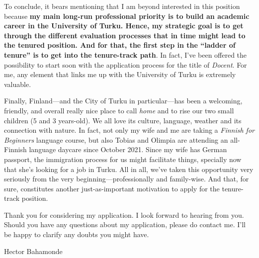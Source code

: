 \documentclass[10pt,stdletter,dateno,sigleft]{newlfm} %
\begin{document}
\begin{newlfm}
To conclude, it bears mentioning that I am beyond interested in this position because {\bf my main long-run professional priority is to build an academic career in the University of Turku.  Hence, my strategic goal is to get through the different evaluation processes that in time might lead to the tenured position. And for that, the first step in the ``ladder of tenure'' is to get into the tenure-track path}. In fact, I've been offered the possibility to start soon with the application process for the title of \emph{Docent}. For me, any element that links me up with the University of Turku is extremely valuable. 

Finally, Finland---and the City of Turku in particular---has been a welcoming, friendly, and overall really nice place to call \emph{home} and to rise our two small children (5 and 3 years-old). We all love its culture, language, weather and its connection with nature. In fact, not only my wife and me are taking a \emph{Finnish for Beginners} language course, but also Tobias and Olimpia are attending an all-Finnish language daycare since October 2021. Since my wife has German passport, the immigration process for us might facilitate things, specially now that she's looking for a job in Turku. All in all, we've taken this opportunity very seriously from the very beginning---professionally and family-wise. And that, for sure, constitutes another just-as-important motivation to apply for the tenure-track position. 

Thank you for considering my application. I look forward to hearing from you. Should you have any questions about my application, please do contact me. I'll be happy to clarify any doubts you might have.




\vspace{7cm}

{\hspace{12cm}Hector Bahamonde}



\end{newlfm}
\end{document}
